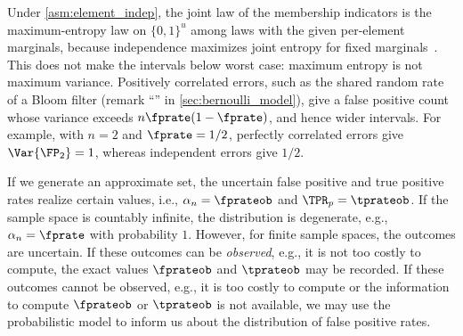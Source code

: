 Under \cref{asm:element_indep}, the joint law of the membership indicators is the maximum-entropy law on $\{0,1\}^u$ among laws with the given per-element marginals, because independence maximizes joint entropy for fixed marginals~\cite{coverThomas}.
This does not make the intervals below worst case: maximum entropy is not maximum variance.
Positively correlated errors, such as the shared random rate of a Bloom filter (remark ``'' in \cref{sec:bernoulli_model}), give a false positive count whose variance exceeds $n\fprate(1-\fprate)$, and hence wider intervals.
For example, with $n = 2$ and $\fprate = 1/2$, perfectly correlated errors give $\Var{\FP_2} = 1$, whereas independent errors give $1/2$.

If we generate an approximate set, the uncertain false positive and true positive rates realize certain values, i.e., $\alpha_n = \fprateob$ and $\TPR_p = \tprateob$.
If the sample space is countably infinite, the distribution is degenerate, e.g., $\alpha_n = \fprate$ with probability $1$.
However, for finite sample spaces, the outcomes are uncertain.
If these outcomes can be \emph{observed}, e.g., it is not too costly to compute, the exact values $\fprateob$ and $\tprateob$ may be recorded.
If these outcomes cannot be observed, e.g., it is too costly to compute or the information to compute $\fprateob$ or $\tprateob$ is not available, we may use the probabilistic model to inform us about the distribution of false positive rates.

